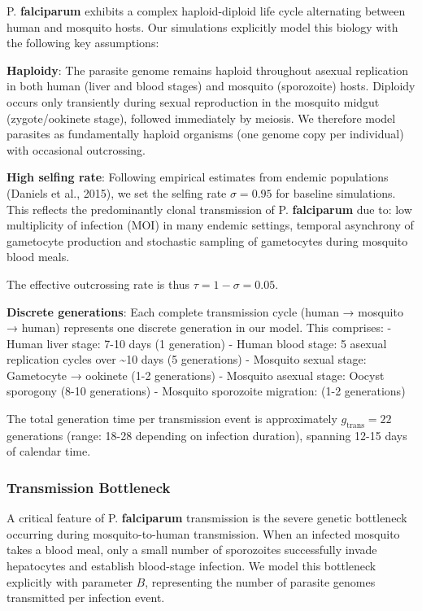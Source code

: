 \documentclass[
  11pt,
]{article}
\begin{document}
P. \textbf{falciparum} exhibits a complex haploid-diploid life cycle
alternating between human and mosquito hosts. Our simulations explicitly
model this biology with the following key assumptions:

\textbf{Haploidy}: The parasite genome remains haploid throughout
asexual replication in both human (liver and blood stages) and mosquito
(sporozoite) hosts. Diploidy occurs only transiently during sexual
reproduction in the mosquito midgut (zygote/ookinete stage), followed
immediately by meiosis. We therefore model parasites as fundamentally
haploid organisms (one genome copy per individual) with occasional
outcrossing.

\textbf{High selfing rate}: Following empirical estimates from endemic
populations (Daniels et al., 2015), we set the selfing rate
\(\sigma = 0.95\) for baseline simulations. This reflects the
predominantly clonal transmission of P. \textbf{falciparum} due to: low
multiplicity of infection (MOI) in many endemic settings, temporal
asynchrony of gametocyte production and stochastic sampling of
gametocytes during mosquito blood meals.

The effective outcrossing rate is thus \(\tau = 1 - \sigma = 0.05\).

\textbf{Discrete generations}: Each complete transmission cycle (human →
mosquito → human) represents one discrete generation in our model. This
comprises: - Human liver stage: 7-10 days (1 generation) - Human blood
stage: 5 asexual replication cycles over \textasciitilde10 days (5
generations) - Mosquito sexual stage: Gametocyte → ookinete (1-2
generations) - Mosquito asexual stage: Oocyst sporogony (8-10
generations) - Mosquito sporozoite migration: (1-2 generations)

The total generation time per transmission event is approximately
\(g_{\text{trans}} = 22\) generations (range: 18-28 depending on
infection duration), spanning 12-15 days of calendar time.

\subsubsection{Transmission Bottleneck}\label{transmission-bottleneck}

A critical feature of P. \textbf{falciparum} transmission is the severe
genetic bottleneck occurring during mosquito-to-human transmission. When
an infected mosquito takes a blood meal, only a small number of
sporozoites successfully invade hepatocytes and establish blood-stage
infection. We model this bottleneck explicitly with parameter \(B\),
representing the number of parasite genomes transmitted per infection
event.
\end{document}
